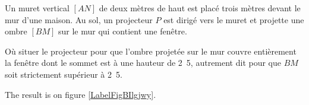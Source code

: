 
\begin{exercice}\label{exosmath-0379}

    Un muret vertical \( [AN]\) de deux mètres de haut est placé trois mètres devant le mur d'une maison. Au sol, un projecteur \( P\) est dirigé vers le muret et projette une ombre \( [BM]\) sur le mur qui contient une fenêtre.

    Où situer le projecteur pour que l'ombre projetée sur le mur couvre entièrement la fenêtre dont le sommet est à une hauteur de \unit{2.5}{\meter}, autrement dit pour que \( BM\) soit strictement supérieur à \unit{2.5}{\meter}.

The result is on figure \ref{LabelFigBIlgjwy}. %
\newcommand{\CaptionFigBIlgjwy}{<+Type your caption here+>}


\end{exercice}
